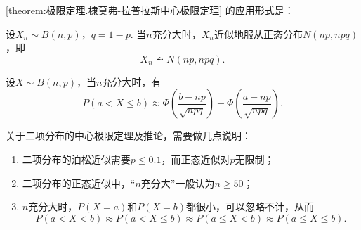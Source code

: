 \cref{theorem:极限定理.棣莫弗-拉普拉斯中心极限定理} 的应用形式是：
\begin{corollary}
设\(X_n \sim B(n,p)\)，\(q = 1-p\).
当\(n\)充分大时，\(X_n\)近似地服从正态分布\(N(np,npq)\)，即\[
X_n \dotsim N(np,npq).
\]
\end{corollary}

\begin{corollary}
设\(X \sim B(n,p)\)，当\(n\)充分大时，有\[
P(a < X \leq b)
\approx \Phi\left(\frac{b-np}{\sqrt{npq}}\right) - \Phi\left(\frac{a-np}{\sqrt{npq}}\right).
\]
\end{corollary}

关于二项分布的中心极限定理及推论，需要做几点说明：
\begin{enumerate}
\item 二项分布的泊松近似需要\(p \leq 0.1\)，而正态近似对\(p\)无限制；
\item 二项分布的正态近似中，“\(n\)充分大”一般认为\(n \geq 50\)；
\item \(n\)充分大时，\(P(X=a)\)和\(P(X=b)\)都很小，可以忽略不计，从而\[
P(a < X < b)
\approx P(a < X \leq b)
\approx P(a \leq X < b)
\approx P(a \leq X \leq b).
\]
\end{enumerate}
